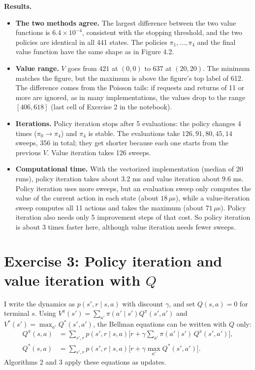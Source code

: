 \documentclass[letterpaper, 11pt]{article}
\newcommand{\1}{\mathds{1}}	%
\theoremstyle{definition}
\begin{document}
\textbf{Results.}
\begin{itemize}
  \item \textbf{The two methods agree.} The largest difference between the two value functions is $6.4 \times 10^{-4}$, consistent with the stopping threshold, and the two policies are identical in all 441 states. The policies $\pi_1, \dots, \pi_4$ and the final value function have the same shape as in Figure 4.2.
  \item \textbf{Value range.} $V$ goes from $421$ at $(0, 0)$ to $637$ at $(20, 20)$. The minimum matches the figure, but the maximum is above the figure's top label of 612. The difference comes from the Poisson tails: if requests and returns of 11 or more are ignored, as in many implementations, the values drop to the range $[406, 618]$ (last cell of Exercise 2 in the notebook).
  \item \textbf{Iterations.} Policy iteration stops after 5 evaluations: the policy changes 4 times ($\pi_0 \to \pi_4$) and $\pi_4$ is stable. The evaluations take $126, 91, 80, 45, 14$ sweeps, 356 in total; they get shorter because each one starts from the previous $V$. Value iteration takes 126 sweeps.
  \item \textbf{Computational time.} With the vectorized implementation (median of 20 runs), policy iteration takes about $3.2$ ms and value iteration about $9.6$ ms. Policy iteration uses more sweeps, but an evaluation sweep only computes the value of the current action in each state (about $18\,\mu$s), while a value-iteration sweep computes all 11 actions and takes the maximum (about $71\,\mu$s). Policy iteration also needs only 5 improvement steps of that cost. So policy iteration is about 3 times faster here, although value iteration needs fewer sweeps.
\end{itemize}

\section*{Exercise 3: Policy iteration and value iteration with $Q$}

I write the dynamics as $p(s', r \mid s, a)$ with discount $\gamma$, and set $Q(s, a) = 0$ for terminal $s$. Using $V^\pi(s') = \sum_{a'} \pi(a' \mid s') Q^\pi(s', a')$ and $V^*(s') = \max_{a'} Q^*(s', a')$, the Bellman equations can be written with $Q$ only:
\begin{align*}
Q^\pi(s, a) &= \sum_{s', r} p(s', r \mid s, a) \Big[ r + \gamma \sum_{a'} \pi(a' \mid s')\, Q^\pi(s', a') \Big], \\
Q^*(s, a) &= \sum_{s', r} p(s', r \mid s, a) \Big[ r + \gamma \max_{a'} Q^*(s', a') \Big].
\end{align*}
Algorithms 2 and 3 apply these equations as updates.
\end{document}
